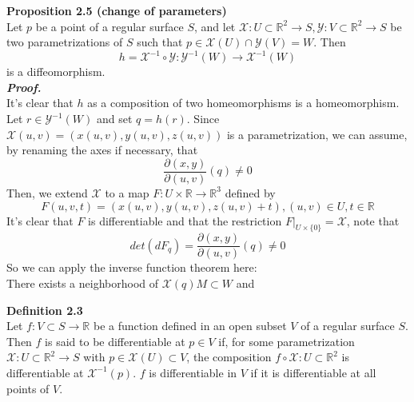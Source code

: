 \documentclass{article}
\begin{document}
\par
\textbf{Proposition 2.5 (change of parameters)}\\
Let $p$ be a point of a regular surface $S$, and let $\mathcal{X}: U \subset \mathbb{R}^2 \to S, \mathcal{Y}: V \subset \mathbb{R}^2 \to S$
be two parametrizations of $S$ such that $p \in \mathcal{X}(U) \cap \mathcal{Y}(V) = W$. Then
$$
    h = \mathcal{X}^{-1} \circ \mathcal{Y}: \mathcal{Y}^{-1}(W) \to \mathcal{X}^{-1}(W)
$$
is a diffeomorphism.\\
\textbf{\textit{Proof.}}\\
It's clear that $h$ as a composition of two homeomorphisms is a homeomorphism.\\
Let $r \in \mathcal{Y}^{-1}(W)$ and set $q = h(r)$. Since $\mathcal{X}(u,v) = (x(u,v), y(u,v), z(u,v))$ is a parametrization,
we can assume, by renaming the axes if necessary, that
$$
    \frac{\partial (x,y)}{\partial (u,v)}(q) \neq 0
$$
Then, we extend $\mathcal{X}$ to a map $F: U \times \mathbb{R} \to \mathbb{R}^3$ defined by
$$
    F(u,v,t) = (x(u,v), y(u,v), z(u,v)+t), (u,v) \in U, t \in \mathbb{R}
$$
It's clear that $F$ is differentiable and that the restriction $F|_{U \times \{0\}} = \mathcal{X}$, note that
$$
    det(dF_q) = \frac{\partial (x,y)}{\partial (u,v)}(q) \neq 0
$$
So we can apply the inverse function theorem here:\\
There exists a neighborhood of $\mathcal{X}(q)$$M \subset W$ and 

\par
\textbf{Definition 2.3}\\
Let $f: V \subset S \to \mathbb{R}$ be a function defined in an open subset $V$ of a regular surface $S$. Then $f$ is said to be
differentiable at $p \in V$ if, for some parametrization $\mathcal{X}: U \subset \mathbb{R}^2 \to S$ with $p \in \mathcal{X}(U) \subset V$, the 
composition $f \circ \mathcal{X}: U \subset \mathbb{R}^2$ is differentiable at $\mathcal{X}^{-1}(p)$. $f$ is differentiable in $V$ if it is differentiable
at all points of $V$.
\end{document}
